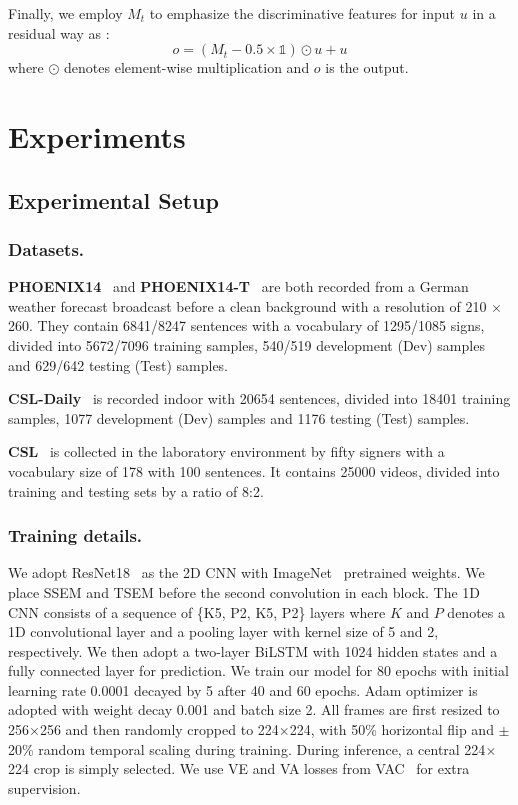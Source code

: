 \documentclass[letterpaper]{article} \usepackage{aaai23}  \usepackage{times}  \usepackage{helvet}  \usepackage{courier}  \usepackage[hyphens]{url}  \usepackage{graphicx} \urlstyle{rm} \def\UrlFont{\rm}  \usepackage{natbib}  \usepackage{caption} \frenchspacing  \setlength{\pdfpagewidth}{8.5in} \setlength{\pdfpageheight}{11in} \usepackage{algorithm}
\begin{document}
Finally, we employ $M_t $ to emphasize the discriminative features for input $u$ in a residual way as :
\begin{equation}
  \label{e6}
  o = (M_t-0.5\times \mathds{1})\odot u+u
  \end{equation}
where $\odot$ denotes element-wise multiplication and $o$ is the output.



\section{Experiments}
\subsection{Experimental Setup}
\subsubsection{Datasets.} \textbf{PHOENIX14}~\cite{koller2015continuous} and \textbf{PHOENIX14-T}~\cite{camgoz2018neural} are both recorded from a German weather forecast broadcast before a clean background with a resolution of 210 $\times$ 260. They contain 6841/8247 sentences with a vocabulary of 1295/1085 signs, divided into 5672/7096 training samples, 540/519 development (Dev) samples and 629/642 testing (Test) samples.

\textbf{CSL-Daily}~\cite{zhou2021improving} is recorded indoor with 20654 sentences, divided into 18401 training samples, 1077 development (Dev) samples and 1176 testing (Test) samples. 

\textbf{CSL}~\cite{huang2018video} is collected in the laboratory environment by fifty signers with a vocabulary size of 178 with 100 sentences. It contains 25000 videos, divided into training and testing sets by a ratio of 8:2.

\subsubsection{Training details.} We adopt ResNet18~\cite{he2016deep} as the 2D CNN with ImageNet~\cite{deng2009imagenet} pretrained weights. We place SSEM and TSEM before the second convolution in each block. The 1D CNN consists of a sequence of \{K5, P2, K5, P2\} layers where $K$ and $P$ denotes a 1D convolutional layer and a pooling layer with kernel size of 5 and 2, respectively. We then adopt a two-layer BiLSTM with 1024 hidden states and a fully connected layer for prediction. We train our model for 80 epochs with initial learning rate 0.0001 decayed by 5 after 40 and 60 epochs. Adam optimizer is adopted with weight decay 0.001 and batch size 2. All frames are first resized to 256$\times$256 and then randomly cropped to 224$\times$224, with 50\% horizontal flip and $\pm$20\% random temporal scaling during training. During inference, a central 224$\times$224 crop is simply selected. We use VE and VA losses from VAC~\cite{Min_2021_ICCV} for extra supervision. 
\end{document}
